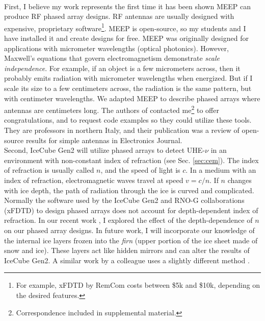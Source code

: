 \documentclass[../../../main.tex]{subfiles}
\begin{document}
\\
\vspace{0.25cm}
First, I believe my work represents the first time it has been shown MEEP can produce RF phased array designs.  RF antennas are usually designed with expensive, proprietary software\footnote{For example, xFDTD by RemCom costs between \$5k and \$10k, depending on the desired features.}.  MEEP is open-source, so my students and I have installed it and create designs for free.  MEEP was originally designed for applications with micrometer wavelengths (optical photonics).  However, Maxwell's equations that govern electromagnetism demonstrate \textit{scale independence}.  For example, if an object is a few micrometers across, then it probably emits radiation with micrometer wavelengths when energized.  But if I scale its size to a few centimeters across, the radiation is the same pattern, but with centimeter wavelengths.  We adapted MEEP to describe phased arrays where antennas are centimeters long.  The authors of \cite{10.3390/electronics8121506} contacted me\footnote{Correspondence included in supplemental material.} to offer congratulations, and to request code examples so they could utilize these tools.  They are professors in northern Italy, and their publication was a review of open-source results for simple antennas in Electronics Journal.
\\
\vspace{0.25cm}
Second, IceCube Gen2 will utilize phased arrays to detect UHE-$\nu$ in an environment with non-constant index of refraction (see Sec. \ref{sec:cem}).  The index of refraction is usually called $n$, and the speed of light is $c$.  In a medium with an index of refraction, electromagnetic waves travel at speed $v = c/n$.  If $n$ changes with ice depth, the path of radiation through the ice is curved and complicated.  Normally the software used by the IceCube Gen2 and RNO-G collaborations (xFDTD) to design phased arrays does not account for depth-dependent index of refraction. In our recent work \cite{electronics10040415}, I explored the effect of the depth-dependence of $n$ on our phased array designs.  In future work, I will incorporate our knowledge of the internal ice layers frozen into the \textit{firn} (upper portion of the ice sheet made of snow and ice).  These layers act like hidden mirrors and can alter the results of IceCube Gen2.  A similar work by a colleague uses a slightly different method \cite{prohira}.
\\
\vspace{0.25cm}
\end{document}
